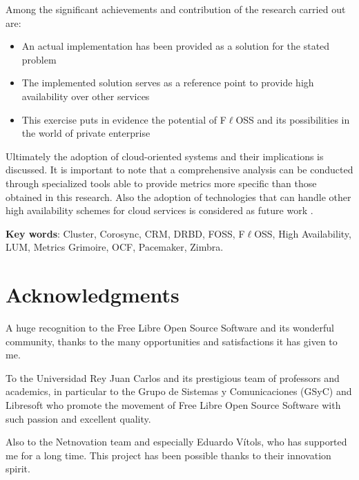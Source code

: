 \documentclass[a4paper, 12pt]{book}
\begin{document}

\noindent Among the significant achievements and contribution of the research carried out are:

\begin{itemize}
  \item An actual implementation has been provided as a solution for the stated problem
  \item The implemented solution serves as a reference point to provide high availability over other services
  \item This exercise puts in evidence the potential of F$\ell$OSS and its possibilities in the world of private enterprise
\end{itemize}


\noindent Ultimately the adoption of cloud-oriented systems and their implications is discussed. It is important to note that a comprehensive analysis can be conducted through specialized tools able to provide metrics more specific than those obtained in this research. Also the adoption of technologies that can handle other high availability schemes for cloud services is considered as future work .\bigskip

\noindent
{\bf Key words}: Cluster, Corosync, CRM, DRBD, FOSS, F$\ell$OSS, High Availability, LUM, Metrics Grimoire, OCF, Pacemaker, Zimbra.

%
\chapter*{Acknowledgments}
\label{chap:acknowledgements}

\noindent A huge recognition to the Free Libre Open Source Software and its wonderful community, thanks to the many opportunities and satisfactions it has given to me.\bigskip

\noindent To the Universidad Rey Juan Carlos and its prestigious team of professors and academics, in particular to the Grupo de Sistemas y Comunicaciones (GSyC) and Libresoft who promote the movement of Free Libre Open Source Software with such passion and excellent quality.\bigskip

\noindent Also to the Netnovation team and especially Eduardo V\'{i}tols, who has supported me for a long time. This project has been possible thanks to their innovation spirit.\bigskip
\end{document}
